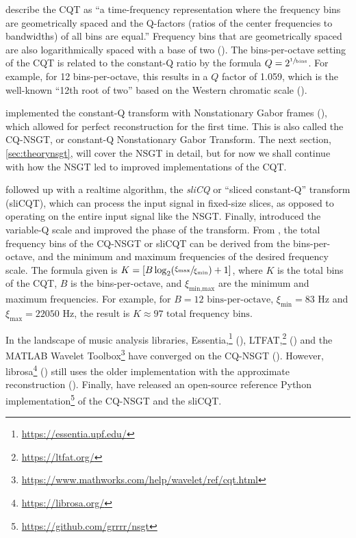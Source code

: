 \documentclass[report.tex]{subfiles}
\begin{document}
\textcite{klapuricqt} describe the CQT as ``a time-frequency representation where the frequency bins are geometrically spaced and the Q-factors (ratios of the center frequencies to bandwidths) of all bins are equal.'' Frequency bins that are geometrically spaced are also logarithmically spaced with a base of two (\cite{geometriclog}). The bins-per-octave setting of the CQT is related to the constant-Q ratio by the formula $Q = 2^{\sfrac{1}{\text{bins}}}$. For example, for 12 bins-per-octave, this results in a $Q$ factor of 1.059, which is the well-known ``12th root of two'' based on the Western chromatic scale (\cite{westernpitch1, westernpitch2}).

\textcite{invertiblecqt} implemented the constant-Q transform with Nonstationary Gabor frames (\cite{balazs}), which allowed for perfect reconstruction for the first time. This is also called the CQ-NSGT, or constant-Q Nonstationary Gabor Transform. The next section, \ref{sec:theorynsgt}, will cover the NSGT in detail, but for now we shall continue with how the NSGT led to improved implementations of the CQT.

\textcite{slicq} followed up with a realtime algorithm, the \textit{sliCQ} or ``sliced constant-Q'' transform (sliCQT), which can process the input signal in fixed-size slices, as opposed to operating on the entire input signal like the NSGT. Finally, \textcite{variableq1} introduced the variable-Q scale and improved the phase of the transform. From \textcite{invertiblecqt}, the total frequency bins of the CQ-NSGT or sliCQT can be derived from the bins-per-octave, and the minimum and maximum frequencies of the desired frequency scale. The formula given is $K = [B \log_{2}(\sfrac{\xi_{\text{max}}}{\xi_{\text{min}}}) + 1]$, where $K$ is the total bins of the CQT, $B$ is the bins-per-octave, and $\xi_{\text{min,max}}$ are the minimum and maximum frequencies. For example, for $B = 12 \text{ bins-per-octave}$, $\xi_{\text{min}} = 83 \text{ Hz}$ and $\xi_{\text{max}} = 22050 \text{ Hz}$, the result is $K \approx 97 \text{ total frequency bins}$.

In the landscape of music analysis libraries, Essentia,\footnote{\url{https://essentia.upf.edu/}} (\cite{essentia}), LTFAT,\footnote{\url{https://ltfat.org/}} (\cite{ltfat}) and the MATLAB Wavelet Toolbox\footnote{\url{https://www.mathworks.com/help/wavelet/ref/cqt.html}} have converged on the CQ-NSGT (\cite{invertiblecqt, slicq, variableq1}). However, librosa\footnote{\url{https://librosa.org/}} (\cite{librosa}) still uses the older implementation with the approximate reconstruction (\cite{klapuricqt}). Finally, \textcite{invertiblecqt} have released an open-source reference Python implementation\footnote{\url{https://github.com/grrrr/nsgt}} of the CQ-NSGT and the sliCQT.
\end{document}
